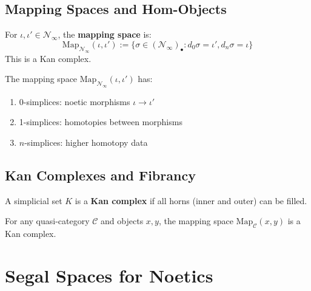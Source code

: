\section{Mapping Spaces and Hom-Objects}

\begin{definition}
\label{def:mapping-space}
For $\iota, \iota' \in \mathcal{N}_\infty$, the \textbf{mapping space} is:
\[
\mathrm{Map}_{\mathcal{N}_\infty}(\iota, \iota') := \{\sigma \in (\mathcal{N}_\infty)_\bullet : d_0\sigma = \iota', d_n\sigma = \iota\}
\]
This is a Kan complex.
\end{definition}

\begin{proposition}
\label{prop:noetic-mapping}
The mapping space $\mathrm{Map}_{\mathcal{N}_\infty}(\iota, \iota')$ has:
\begin{enumerate}[label=(\roman*)]
  \item 0-simplices: noetic morphisms $\iota \to \iota'$
  \item 1-simplices: homotopies between morphisms
  \item $n$-simplices: higher homotopy data
\end{enumerate}
\end{proposition}

\section{Kan Complexes and Fibrancy}

\begin{definition}
\label{def:kan-complex}
A simplicial set $K$ is a \textbf{Kan complex} if all horns (inner and outer)
can be filled.
\end{definition}

\begin{proposition}
\label{prop:mapping-kan}
For any quasi-category $\mathcal{C}$ and objects $x, y$, the mapping space
$\mathrm{Map}_\mathcal{C}(x, y)$ is a Kan complex.
\end{proposition}


\chapter{Segal Spaces for Noetics}
\label{ch:segal-spaces}

